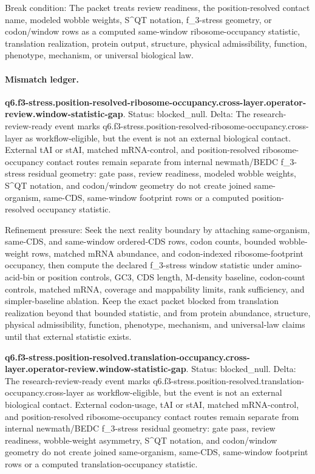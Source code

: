 Break condition: The packet treats review readiness, the position-resolved contact name, modeled wobble weights, S\textasciicircum{}QT notation, f\_3-stress geometry, or codon/window rows as a computed same-window ribosome-occupancy statistic, translation realization, protein output, structure, physical admissibility, function, phenotype, mechanism, or universal biological law.

\paragraph{Mismatch ledger.}
\textbf{q6.f3-stress.position-resolved-ribosome-occupancy.cross-layer.operator-review.window-statistic-gap}. Status: blocked\_null. Delta: The research-review-ready event marks q6.f3-stress.position-resolved-ribosome-occupancy.cross-layer as workflow-eligible, but the event is not an external biological contact. External tAI or stAI, matched mRNA-control, and position-resolved ribosome-occupancy contact routes remain separate from internal newmath/BEDC f\_3-stress residual geometry: gate pass, review readiness, modeled wobble weights, S\textasciicircum{}QT notation, and codon/window geometry do not create joined same-organism, same-CDS, same-window footprint rows or a computed position-resolved occupancy statistic.

Refinement pressure: Seek the next reality boundary by attaching same-organism, same-CDS, and same-window ordered-CDS rows, codon counts, bounded wobble-weight rows, matched mRNA abundance, and codon-indexed ribosome-footprint occupancy, then compute the declared f\_3-stress window statistic under amino-acid-bin or position controls, GC3, CDS length, M-density baseline, codon-count controls, matched mRNA, coverage and mappability limits, rank sufficiency, and simpler-baseline ablation. Keep the exact packet blocked from translation realization beyond that bounded statistic, and from protein abundance, structure, physical admissibility, function, phenotype, mechanism, and universal-law claims until that external statistic exists.

\textbf{q6.f3-stress.position-resolved.translation-occupancy.cross-layer.operator-review.window-statistic-gap}. Status: blocked\_null. Delta: The research-review-ready event marks q6.f3-stress.position-resolved.translation-occupancy.cross-layer as workflow-eligible, but the event is not an external biological contact. External codon-usage, tAI or stAI, matched mRNA-control, and position-resolved ribosome-occupancy contact routes remain separate from internal newmath/BEDC f\_3-stress residual geometry: gate pass, review readiness, wobble-weight asymmetry, S\textasciicircum{}QT notation, and codon/window geometry do not create joined same-organism, same-CDS, same-window footprint rows or a computed translation-occupancy statistic.

